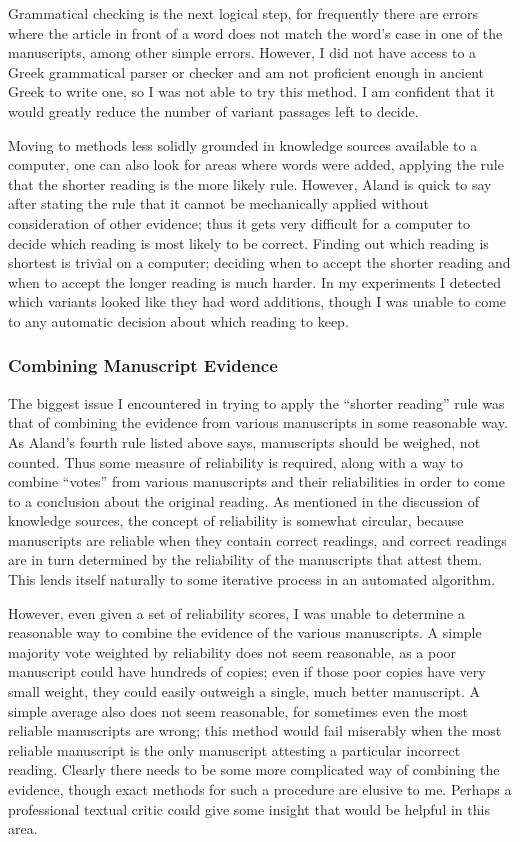 \documentclass[onecolumn, 12pt]{article}
\begin{document}
Grammatical checking is the next logical step, for frequently there are errors
where the article in front of a word does not match the word's case in one of
the manuscripts, among other simple errors.  However, I did not have access to
a Greek grammatical parser or checker and am not proficient enough in ancient
Greek to write one, so I was not able to try this method.  I am confident that
it would greatly reduce the number of variant passages left to decide.

Moving to methods less solidly grounded in knowledge sources available to a
computer, one can also look for areas where words were added, applying the rule
that the shorter reading is the more likely rule.  However, Aland is quick to
say after stating the rule that it cannot be mechanically applied without
consideration of other evidence; thus it gets very difficult for a computer to
decide which reading is most likely to be correct.  Finding out which reading
is shortest is trivial on a computer; deciding when to accept the shorter
reading and when to accept the longer reading is much harder.  In my
experiments I detected which variants looked like they had word additions,
though I was unable to come to any automatic decision about which reading to
keep.

\subsubsection{Combining Manuscript Evidence}

The biggest issue I encountered in trying to apply the ``shorter reading'' rule
was that of combining the evidence from various manuscripts in some reasonable
way.  As Aland's fourth rule listed above says, manuscripts should be weighed,
not counted.  Thus some measure of reliability is required, along with a way to
combine ``votes'' from various manuscripts and their reliabilities in order to
come to a conclusion about the original reading.  As mentioned in the
discussion of knowledge sources, the concept of reliability is somewhat
circular, because manuscripts are reliable when they contain correct readings,
and correct readings are in turn determined by the reliability of the
manuscripts that attest them.  This lends itself naturally to some iterative
process in an automated algorithm.

However, even given a set of reliability scores, I was unable to determine a
reasonable way to combine the evidence of the various manuscripts.  A simple
majority vote weighted by reliability does not seem reasonable, as a poor
manuscript could have hundreds of copies; even if those poor copies have very
small weight, they could easily outweigh a single, much better manuscript.  A
simple average also does not seem reasonable, for sometimes even the most
reliable manuscripts are wrong; this method would fail miserably when the most
reliable manuscript is the only manuscript attesting a particular incorrect
reading.  Clearly there needs to be some more complicated way of combining the
evidence, though exact methods for such a procedure are elusive to me.
Perhaps a professional textual critic could give some insight that would be
helpful in this area.
\end{document}
